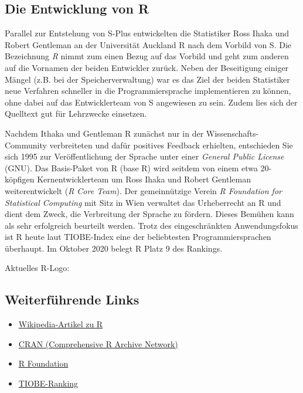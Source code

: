 \documentclass[
]{book}
\providecommand{\tightlist}{%
  \setlength{\itemsep}{0pt}\setlength{\parskip}{0pt}}
\begin{document}
\hypertarget{die-entwicklung-von-r}{%
\subsection{Die Entwicklung von R}\label{die-entwicklung-von-r}}

Parallel zur Entstehung von S-Plus entwickelten die Statistiker Ross Ihaka und Robert Gentleman
an der Universität Auckland R nach dem Vorbild von S. Die Bezeichnung \emph{R} nimmt zum einen Bezug auf das Vorbild und geht zum anderen auf die Vornamen der beiden Entwickler zurück.
Neben der Beseitigung einiger Mängel (z.B. bei der Speicherverwaltung) war es das Ziel der beiden Statistiker neue Verfahren schneller in die Programmiersprache implementieren zu können, ohne dabei auf das Entwicklerteam von S angewiesen zu sein.
Zudem lies sich der Quelltext gut für Lehrzwecke einsetzen.

Nachdem Ithaka und Gentleman R zunächst nur in der Wissenschafts-Community verbreiteten und dafür
positives Feedback erhielten, entschieden Sie sich 1995 zur Veröffentlichung der Sprache unter einer
\emph{General Public License} (GNU).
Das Basis-Paket von R (base R) wird seitdem von einem etwa 20-köpfigen Kernentwicklerteam um Ross Ihaka und Robert
Gentleman weiterentwickelt (\emph{R Core Team}).
Der gemeinnützige Verein \emph{R Foundation for Statistical Computing} mit Sitz in Wien verwaltet das Urheberrecht an R
und dient dem Zweck, die Verbreitung der Sprache zu fördern.
Dieses Bemühen kann als sehr erfolgreich beurteilt werden.
Trotz des eingeschränkten Anwendungsfokus ist R heute laut TIOBE-Index eine der beliebtesten Programmiersprachen überhaupt. Im Oktober 2020 belegt R Platz 9 des Rankings.

Aktuelles R-Logo:

\hypertarget{weiterfuxfchrende-links}{%
\subsection*{Weiterführende Links}\label{weiterfuxfchrende-links}}

\begin{itemize}
\tightlist
\item
  \href{https://de.wikipedia.org/wiki/R_(Programmiersprache)}{Wikipedia-Artikel zu R}
\item
  \href{https://cran.r-project.org/}{CRAN (Comprehensive R Archive Network)}
\item
  \href{https://www.r-project.org/foundation/}{R Foundation}
\item
  \href{https://www.tiobe.com/tiobe-index/}{TIOBE-Ranking}
\end{itemize}
\end{document}
